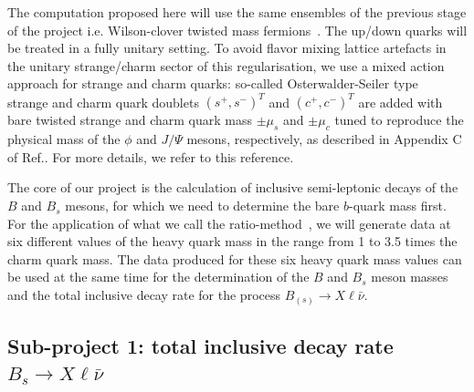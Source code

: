\label{sec:proj}

The computation proposed here will use the same ensembles of the previous stage of the project
i.e. Wilson-clover twisted
mass fermions~\cite{Alexandrou:2018egz}. The up/down quarks will be treated
in a fully unitary setting. To avoid flavor mixing lattice artefacts
in the unitary strange/charm sector of this regularisation, we use a
mixed action approach for strange and charm quarks: so-called
Osterwalder-Seiler type~\cite{Frezzotti:2004wz} strange and charm quark doublets
$(s^+ , s^-)^T$ and $(c^+ , c^- )^T$ are added with bare
twisted strange and charm quark mass $\pm \mu_s$ and $\pm \mu_c$
tuned to reproduce the physical mass of the $\phi$ and $J/\Psi$
mesons, respectively, as described in Appendix C of
Ref.\cite{ExtendedTwistedMass:2022jpw}. For more details, we refer to
this reference.


The core of our project is the calculation of inclusive semi-leptonic
decays of the $B$ and $B_s$ mesons, for which we need to determine the
bare $b$-quark mass first.
For the application of what we call the
ratio-method~\cite{ETM:2009sed}, we will generate data at six
different values of the heavy quark mass in the range from 
1 to 3.5 times the charm quark mass. 
The data produced for these six heavy quark mass values can be used at
the same time for the  determination of the $B$ and $B_s$ meson masses
and the total inclusive decay rate for the process $B_{(s)} \to
X\ell\bar\nu$. 



\subsection{Sub-project 1: total inclusive decay rate $B_s \to X\ell\bar\nu$}


